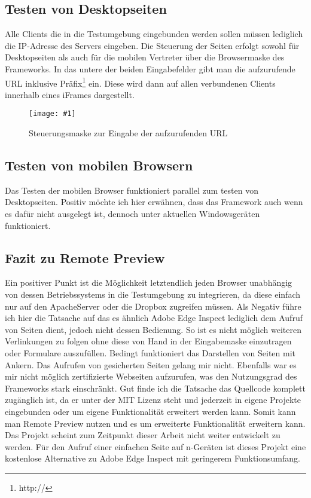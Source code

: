 \documentclass[13pt,a4paper,oneside]{scrbook} %
\renewcommand{\\}{\bigskip}
\newcommand{\ig}[3]{
\begin{figure}[htbp]
	\centering
	\texttt{[image: \#1]}%
	\caption[#2]{#3}%
\end{figure}
}
\begin{document}
		\subsection{Testen von Desktopseiten}
		Alle Clients die in die Testumgebung eingebunden werden sollen müssen lediglich die IP-Adresse des Servers eingeben.
		Die Steuerung der Seiten erfolgt sowohl für Desktopseiten als auch für die mobilen Vertreter über die Browsermaske des 			Frameworks. In das untere der beiden Eingabefelder gibt man die aufzurufende URL inklusive Präfix\footnote{http://} ein. 			Diese wird dann auf allen verbundenen Clients innerhalb eines iFrames dargestellt. 
		\ig{../pictures/remotepreview/eingabemaske}{Remote Preview Steuerungsmaske}{Steuerungsmaske zur Eingabe der 			aufzurufenden URL}
				
		 \subsection{Testen von mobilen Browsern}
		 Das Testen der mobilen Browser funktioniert parallel zum testen von Desktopseiten. Positiv möchte ich hier erwähnen, 			dass das Framework auch wenn es dafür nicht ausgelegt ist, dennoch unter aktuellen Windowsgeräten funktioniert.			
		
		\subsection{Fazit zu Remote Preview}
		Ein positiver Punkt ist die Möglichkeit letztendlich jeden Browser unabhängig von dessen Betriebssystems in die 				Testumgebung zu integrieren, da diese einfach nur auf den ApacheServer oder die Dropbox zugreifen müssen. Als Negativ 		führe ich hier die Tatsache auf das es ähnlich Adobe Edge Inspect lediglich dem Aufruf von Seiten dient, jedoch nicht 			dessen Bedienung. So ist es nicht möglich weiteren Verlinkungen zu folgen ohne diese von Hand in der Eingabemaske 			einzutragen oder Formulare auszufüllen. Bedingt funktioniert das Darstellen von Seiten mit Ankern. Das Aufrufen von 			gesicherten Seiten gelang mir nicht. Ebenfalls war es  mir nicht möglich zertifizierte Webseiten aufzurufen, was den 				Nutzungsgrad des Frameworks stark einschränkt. Gut finde ich die Tatsache das Quellcode komplett zugänglich ist, da er 		unter der MIT Lizenz steht und	jederzeit in eigene Projekte eingebunden oder um eigene Funktionalität erweitert werden 			kann. Somit kann man Remote Preview nutzen und es um erweiterte Funktionalität erweitern kann. Das Projekt 				scheint zum Zeitpunkt dieser Arbeit nicht weiter entwickelt zu werden. Für den Aufruf einer einfachen Seite auf n-Geräten 		ist dieses Projekt eine kostenlose Alternative zu Adobe Edge Inspect mit geringerem Funktionsumfang.
		
\end{document}
